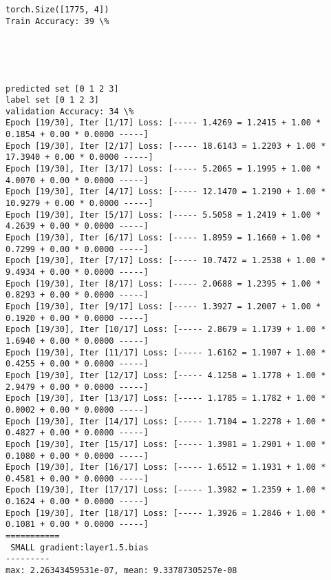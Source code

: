 \documentclass[11pt]{article}
\begin{document}
    \begin{Verbatim}[commandchars=\\\{\}]
torch.Size([1775, 4])
Train Accuracy: 39 \%

    \end{Verbatim}

    \begin{center}
    \end{center}
    { \hspace*{\fill} \\}
    
    \begin{center}
    \end{center}
    { \hspace*{\fill} \\}
    
    \begin{Verbatim}[commandchars=\\\{\}]
predicted set [0 1 2 3]
label set [0 1 2 3]
validation Accuracy: 34 \%
Epoch [19/30], Iter [1/17] Loss: [----- 1.4269 = 1.2415 + 1.00 * 0.1854 + 0.00 * 0.0000 -----]
Epoch [19/30], Iter [2/17] Loss: [----- 18.6143 = 1.2203 + 1.00 * 17.3940 + 0.00 * 0.0000 -----]
Epoch [19/30], Iter [3/17] Loss: [----- 5.2065 = 1.1995 + 1.00 * 4.0070 + 0.00 * 0.0000 -----]
Epoch [19/30], Iter [4/17] Loss: [----- 12.1470 = 1.2190 + 1.00 * 10.9279 + 0.00 * 0.0000 -----]
Epoch [19/30], Iter [5/17] Loss: [----- 5.5058 = 1.2419 + 1.00 * 4.2639 + 0.00 * 0.0000 -----]
Epoch [19/30], Iter [6/17] Loss: [----- 1.8959 = 1.1660 + 1.00 * 0.7299 + 0.00 * 0.0000 -----]
Epoch [19/30], Iter [7/17] Loss: [----- 10.7472 = 1.2538 + 1.00 * 9.4934 + 0.00 * 0.0000 -----]
Epoch [19/30], Iter [8/17] Loss: [----- 2.0688 = 1.2395 + 1.00 * 0.8293 + 0.00 * 0.0000 -----]
Epoch [19/30], Iter [9/17] Loss: [----- 1.3927 = 1.2007 + 1.00 * 0.1920 + 0.00 * 0.0000 -----]
Epoch [19/30], Iter [10/17] Loss: [----- 2.8679 = 1.1739 + 1.00 * 1.6940 + 0.00 * 0.0000 -----]
Epoch [19/30], Iter [11/17] Loss: [----- 1.6162 = 1.1907 + 1.00 * 0.4255 + 0.00 * 0.0000 -----]
Epoch [19/30], Iter [12/17] Loss: [----- 4.1258 = 1.1778 + 1.00 * 2.9479 + 0.00 * 0.0000 -----]
Epoch [19/30], Iter [13/17] Loss: [----- 1.1785 = 1.1782 + 1.00 * 0.0002 + 0.00 * 0.0000 -----]
Epoch [19/30], Iter [14/17] Loss: [----- 1.7104 = 1.2278 + 1.00 * 0.4827 + 0.00 * 0.0000 -----]
Epoch [19/30], Iter [15/17] Loss: [----- 1.3981 = 1.2901 + 1.00 * 0.1080 + 0.00 * 0.0000 -----]
Epoch [19/30], Iter [16/17] Loss: [----- 1.6512 = 1.1931 + 1.00 * 0.4581 + 0.00 * 0.0000 -----]
Epoch [19/30], Iter [17/17] Loss: [----- 1.3982 = 1.2359 + 1.00 * 0.1624 + 0.00 * 0.0000 -----]
Epoch [19/30], Iter [18/17] Loss: [----- 1.3926 = 1.2846 + 1.00 * 0.1081 + 0.00 * 0.0000 -----]
===========
 SMALL gradient:layer1.5.bias
---------
max: 2.26343459531e-07, mean: 9.33787305257e-08

    \end{Verbatim}
\end{document}
